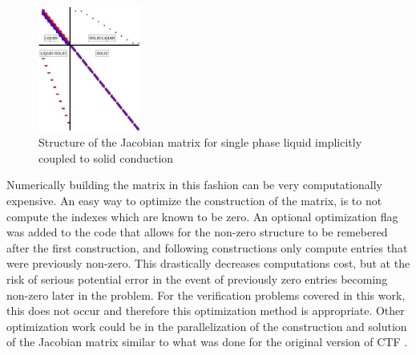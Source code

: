     \begin{figure}[!h]
    	\centering
    	\includegraphics[width=0.30\textwidth]{images/Implicit-Diagram.jpg}
    	\caption{Structure of the Jacobian matrix for single phase liquid
    	implicitly coupled to solid conduction}
    	\label{fig:Implicit-Diagram}
    \end{figure}
    
    Numerically building the matrix in this fashion can be very computationally
    expensive. An easy way to optimize the construction of the matrix, is to not
    compute the indexes which are known to be zero. An optional optimization
    flag was added to the code that allows for the non-zero structure to be
    remebered after the first construction, and following constructions only
    compute entries that were previously non-zero. This drastically decreases
    computations cost, but at the risk of serious potential error in the event
    of previously zero entries becoming non-zero later in the problem. For the
    verification problems covered in this work, this does not occur and
    therefore this optimization method is appropriate. Other optimization work
    could be in the parallelization of the construction and solution of the
    Jacobian matrix similar to what was done for the original version of CTF
    \cite{Salko2014}.
   
    
    
    
    






